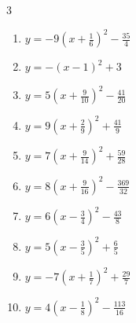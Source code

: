 \begin{multicols}{3}
\begin{enumerate}
\columnbreak %

  \item $\displaystyle y=-9\left( x+\frac{1}{6}\right)^{2}-\frac{35}{4}$


  \item $\displaystyle y=-\left( x-1\right)^{2}+3$

        \phantom{$\displaystyle 頂点\left( 1 , 3 \right)$}

  \item $\displaystyle y=5\left( x+\frac{9}{10}\right)^{2}-\frac{41}{20}$


  \item $\displaystyle y=9\left( x+\frac{2}{9}\right)^{2}+\frac{41}{9}$


  \item $\displaystyle y=7\left( x+\frac{9}{14}\right)^{2}+\frac{59}{28}$


  \item $\displaystyle y=8\left( x+\frac{9}{16}\right)^{2}-\frac{369}{32}$


  \item $\displaystyle y=6\left( x-\frac{3}{4}\right)^{2}-\frac{43}{8}$


  \item $\displaystyle y=5\left( x-\frac{3}{5}\right)^{2}+\frac{6}{5}$


  \item $\displaystyle y=-7\left( x+\frac{1}{7}\right)^{2}+\frac{29}{7}$


  \item $\displaystyle y=4\left( x-\frac{1}{8}\right)^{2}-\frac{113}{16}$


\end{enumerate}
\end{multicols}
